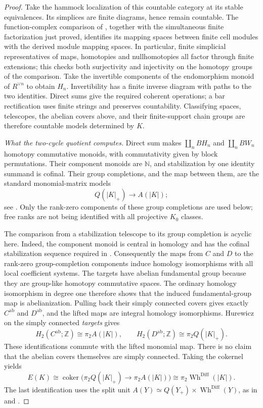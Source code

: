 \begin{proof}
Take the hammock localization of this countable category at its
stable equivalences.  Its simplices are finite diagrams, hence remain
countable.  The function-complex comparison of
\cite[Proposition~4.4 and Application~4.6, p.~432]
{DwyerKan1980Functions}, together with the simultaneous finite
factorization just proved, identifies its mapping spaces between
finite cell modules with the derived module mapping spaces.  In
particular, finite simplicial representatives of maps, homotopies
and nullhomotopies all factor through finite extensions; this checks
both surjectivity and injectivity on the homotopy groups of the
comparison.  Take the invertible components of the endomorphism
monoid of $R^{\vee n}$ to obtain $H_n$.  Invertibility has a finite
inverse diagram with paths to the two identities.  Direct sums give
the required coherent operations; a bar rectification uses finite
strings and preserves countability.  Classifying spaces, telescopes,
the abelian covers above, and their finite-support chain groups are
therefore countable models determined by $K$.

\emph{What the two-cycle quotient computes.}
Direct sum makes
$\coprod_nBH_n$ and $\coprod_nBW_n$ homotopy commutative monoids,
with commutativity given by block permutations.  Their component
monoids are $\mathbb N$, and stabilization by one identity summand
is cofinal.  Their group completions, and the map between them, are
the standard monomial-matrix models
\[
 Q(|K|_+)\longrightarrow A(|K|);
\]
see \cite[Section~2, p.~247]{Jahren2010}.
Only the rank-zero components of these group completions are used
below; free ranks are not being identified with all projective
$K_0$ classes.

The comparison from a stabilization telescope to its group completion
is acyclic here.  Indeed, the component monoid is central in homology
and has the cofinal stabilization sequence required in
\cite[Proposition~1.1 and proof, pp.~1--7]{Gritschacher2026Acyclicity}.
Consequently the maps from $C$ and $D$ to the rank-zero group-completion
components induce homology isomorphisms with all local coefficient
systems.  The targets have abelian fundamental group because they
are group-like homotopy commutative spaces.  The ordinary homology
isomorphism in degree one therefore shows that the induced
fundamental-group map is abelianization.  Pulling back their simply
connected covers gives exactly $C^{\mathrm{ab}}$ and
$D^{\mathrm{ab}}$, and the lifted maps are integral homology
isomorphisms.  Hurewicz on the simply connected \emph{targets} gives
\[
 H_2(C^{\mathrm{ab}};\mathbb Z)\cong\pi_2A(|K|),\qquad
 H_2(D^{\mathrm{ab}};\mathbb Z)\cong\pi_2Q(|K|_+).
\]
These identifications commute with the lifted monomial map.
There is no claim that the abelian covers themselves are simply
connected.  Taking the cokernel yields
\[
 E(K)\cong
 \operatorname{coker}\bigl(\pi_2Q(|K|_+)\to\pi_2A(|K|)\bigr)
 \cong\pi_2\operatorname{Wh}^{\mathrm{Diff}}(|K|).
\]
The last identification uses the split unit
$A(Y)\simeq Q(Y_+)\times\operatorname{Wh}^{\mathrm{Diff}}(Y)$,
as in \cite[pp.~247--248]{Jahren2010} and
\cite[Definition~1.3.4 and (1.3.5), p.~18]
{WaldhausenJahrenRognes2013}.


\end{proof}
